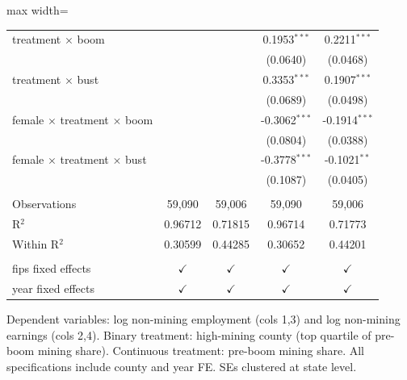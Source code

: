 \begin{table}[htbp]
\begin{adjustbox}{max width=\textwidth}
\begin{tabular}{lcccc}
      treatment $\times$ boom                           &                &                 & 0.1953$^{***}$  & 0.2211$^{***}$\\   
                                                        &                &                 & (0.0640)        & (0.0468)\\   
      treatment $\times$ bust                           &                &                 & 0.3353$^{***}$  & 0.1907$^{***}$\\   
                                                        &                &                 & (0.0689)        & (0.0498)\\   
      female $\times$ treatment $\times$ boom           &                &                 & -0.3062$^{***}$ & -0.1914$^{***}$\\   
                                                        &                &                 & (0.0804)        & (0.0388)\\   
      female $\times$ treatment $\times$ bust           &                &                 & -0.3778$^{***}$ & -0.1021$^{**}$\\   
                                                        &                &                 & (0.1087)        & (0.0405)\\   
       \\
      Observations                                      & 59,090         & 59,006          & 59,090          & 59,006\\  
      R$^2$                                             & 0.96712        & 0.71815         & 0.96714         & 0.71773\\  
      Within R$^2$                                      & 0.30599        & 0.44285         & 0.30652         & 0.44201\\  
       \\
      fips fixed effects                                & $\checkmark$   & $\checkmark$    & $\checkmark$    & $\checkmark$\\   
      year fixed effects                                & $\checkmark$   & $\checkmark$    & $\checkmark$    & $\checkmark$\\   
      \bottomrule
   \end{tabular}
   \end{adjustbox}

   \par \raggedright \small 
   Dependent variables: log non-mining employment (cols 1,3) and log non-mining earnings (cols 2,4). Binary treatment: high-mining county (top quartile of pre-boom mining share). Continuous treatment: pre-boom mining share. All specifications include county and year FE. SEs clustered at state level.
\end{table}



